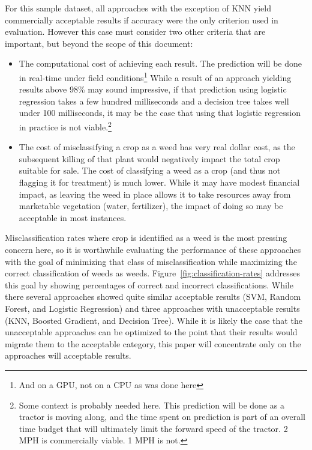 \documentclass[letterpaper]{article}
\begin{document}
{{For this sample dataset, all approaches with the exception of KNN yield commercially acceptable results if accuracy were the only criterion used in evaluation. However this case must consider two other criteria that are important, but beyond the scope of this document:
\begin{itemize}
\item{The computational cost of achieving each result. The prediction will be done in real-time under field conditions\footnote{And on a GPU, not on a CPU as was done here} While a result of an approach yielding results above 98\% may sound impressive, if that prediction using logistic regression takes a few hundred milliseconds and a decision tree takes well under 100 milliseconds, it may be the case that using that logistic regression in practice is not viable.\footnote{Some context is probably needed here. This prediction will be done as a tractor is moving along, and the time spent on prediction is part of an overall time budget that will ultimately limit the forward speed of the tractor. 2 MPH is commercially viable. 1 MPH is not.}}
\item{The cost of misclassifying a crop as a weed has very real dollar cost, as the subsequent killing of that plant would negatively impact the total crop suitable for sale. The cost of classifying a weed as a crop (and thus not flagging it for treatment) is much lower. While it may have modest financial impact, as leaving the weed in place allows it to take resources away from marketable vegetation (water, fertilizer), the impact of doing so may be acceptable in most instances.}
\end{itemize}
 
Misclassification rates where crop is identified as a weed is the most pressing concern here, so it is worthwhile evaluating the performance of these approaches with the goal of minimizing that class of misclassification while maximizing the correct classification of weeds as weeds. Figure~\ref{fig:classification-rates} addresses this goal by showing percentages of correct and incorrect classifications. While there several approaches showed quite similar acceptable  results (SVM, Random Forest, and Logistic Regression) and three approaches with unacceptable results (KNN, Boosted Gradient, and Decision Tree). While it is likely the case that the unacceptable approaches can be optimized to the point that their results would migrate them to the acceptable category, this paper will concentrate only on the approaches will acceptable results.

}}
\end{document}
